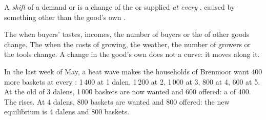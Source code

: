 \begin{definition}\label{def:g7:demand-and-supply-first-look:shift}
A \emph{shift} of a demand or  is a change of the
 or supplied \emph{at every }, caused by something other than the
good's own .
\end{definition}

The   when buyers' tastes, incomes, the number of buyers or the  of
other goods change. The   when the costs of growing, the weather, the
number of growers or the tools change. A change in the good's own  does not  a
curve: it moves along it.

\begin{example}
In the last week of May, a heat wave makes the households of Brenmoor want 400 more baskets
at every : 1\,400 at 1 dalen, 1\,200 at 2, 1\,000 at 3, 800 at 4, 600 at 5. At the old
 of 3 dalens, 1\,000 baskets are now wanted and 600 offered: a  of 400. The
 rises. At 4 dalens, 800 baskets are wanted and 800 offered: the new equilibrium is 4
dalens and 800 baskets.
\end{example}

